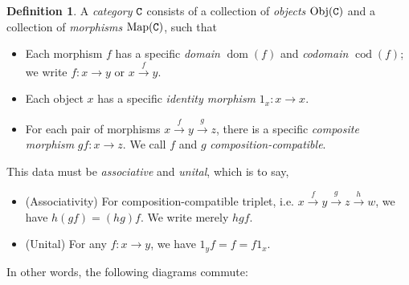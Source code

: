 \documentclass[11 pt]{amsart}
\theoremstyle{plain}   %
\theoremstyle{definition}
\newtheorem{defn}{Definition}[section]
\theoremstyle{remark}
\numberwithin{equation}{section}
\DeclareMathOperator{\dom}{dom}
\DeclareMathOperator{\cod}{cod}
\newcommand{\cat}[1]{{\normalfont\texttt{#1}}}
\newcommand{\Obj}[1]{\text{Obj}(\cat{#1})}
\newcommand{\Map}[1]{\text{Map}(\cat{#1})}
\begin{document}
\begin{defn}
	A \emph{category} $\cat{C}$ consists of a collection of \emph{objects} $\Obj{C}$
	and a collection of \emph{morphisms} $\Map{C}$, such that

	\begin{itemize}
		\item Each morphism $f$ has a specific \emph{domain} $\dom(f)$ and
		      \emph{codomain} $\cod(f)$; we write $f: x\rightarrow y$ or
		      $x\xrightarrow{f} y$.
		\item Each object $x$ has a specific \emph{identity morphism} $1_x:
			      x\rightarrow x$.
		\item For each pair of morphisms $x\xrightarrow{f} y\xrightarrow{g}
			      z$, there is a specific \emph{composite morphism} $gf:
			      x\rightarrow z$. We call $f$ and $g$ \emph{composition-compatible}.
	\end{itemize}
	This data must be \emph{associative} and \emph{unital}, which is to say,
	\begin{itemize}
		\item (Associativity) For composition-compatible triplet, i.e.
		      $x\xrightarrow{f}y \xrightarrow{g}z\xrightarrow{h}w$, we have $h(gf) =
			      (hg)f$. We write merely $hgf$.
		\item (Unital) For any $f: x\rightarrow y$, we have $1_yf = f = f1_x$.
	\end{itemize}

	In other words, the following diagrams commute:

	\begin{figure}[H]
		\centering
		\begin{multicols}{2}

		\end{multicols}
	\end{figure}
\end{defn}
\end{document}
